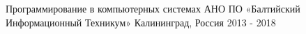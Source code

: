 

\begin{cventries}

\cventry
    {Программирование в компьютерных системах} %
    {АНО ПО «Балтийский Информационный Техникум»} %
    {Калининград, Россия} %
    {2013 - 2018} %
    {}

\end{cventries}
